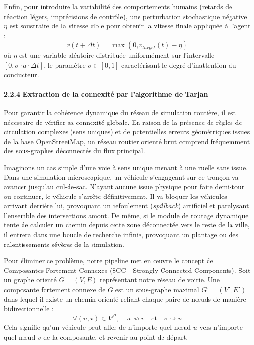 \documentclass[10pt, a4paper]{article}
\begin{document}
Enfin, pour introduire la variabilité des comportements humains (retards
de réaction légers, imprécisions de contrôle), une perturbation
stochastique négative \(\eta\) est soustraite de la vitesse cible pour
obtenir la vitesse finale appliquée à l'agent :
\[v(t + \Delta t) = \max\left( 0, v_{target}(t) - \eta \right)\] où
\(\eta\) est une variable aléatoire distribuée uniformément sur
l'intervalle \([0, \sigma \cdot a \cdot \Delta t]\), le paramètre
\(\sigma \in [0, 1]\) caractérisant le degré d'inattention du
conducteur.

\paragraph{2.2.4 Extraction de la connexité par l'algorithme de
Tarjan}\label{extraction-de-la-connexituxe9-par-lalgorithme-de-tarjan}

Pour garantir la cohérence dynamique du réseau de simulation routière,
il est nécessaire de vérifier sa connexité globale. En raison de la
présence de règles de circulation complexes (sens uniques) et de
potentielles erreurs géométriques issues de la base OpenStreetMap, un
réseau routier orienté brut comprend fréquemment des sous-graphes
déconnectés du flux principal.

Imaginons un cas simple d'une voie à sens unique menant à une ruelle
sans issue. Dans une simulation microscopique, un véhicule s'engageant
sur ce tronçon va avancer jusqu'au cul-de-sac. N'ayant aucune issue
physique pour faire demi-tour ou continuer, le véhicule s'arrête
définitivement. Il va bloquer les véhicules arrivant derrière lui,
provoquant un refoulement (\emph{spillback}) artificiel et paralysant
l'ensemble des intersections amont. De même, si le module de routage
dynamique tente de calculer un chemin depuis cette zone déconnectée vers
le reste de la ville, il entrera dans une boucle de recherche infinie,
provoquant un plantage ou des ralentissements sévères de la simulation.

Pour éliminer ce problème, notre pipeline met en œuvre le concept de
Composantes Fortement Connexes (SCC - Strongly Connected Components).
Soit un graphe orienté \(G = (V, E)\) représentant notre réseau de
voirie. Une composante fortement connexe de \(G\) est un sous-graphe
maximal \(G' = (V', E')\) dans lequel il existe un chemin orienté
reliant chaque paire de nœuds de manière bidirectionnelle :
\[\forall (u, v) \in V'^2, \quad u \rightsquigarrow v \quad \text{et} \quad v \rightsquigarrow u\]
Cela signifie qu'un véhicule peut aller de n'importe quel nœud \(u\)
vers n'importe quel nœud \(v\) de la composante, et revenir au point de
départ.
\end{document}
